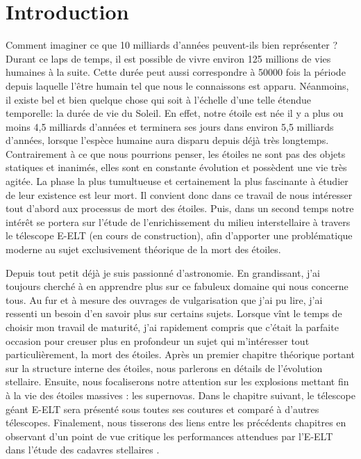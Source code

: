 

\chapter*{Introduction}


\vfill

Comment imaginer ce que 10 milliards d'années peuvent-ils bien représenter ? Durant ce laps de temps, il est possible de vivre environ 125 millions de vies humaines à la suite. Cette durée peut aussi correspondre à 50000 fois la période depuis laquelle l'être humain tel que nous le connaissons est apparu. Néanmoins, il existe bel et bien quelque chose qui soit à l'échelle d'une telle étendue temporelle: la durée de vie du Soleil. En effet, notre étoile est née il y a plus ou moins 4,5 milliards d'années et terminera ses jours dans environ 5,5 milliards d'années, lorsque l'espèce humaine aura disparu depuis déjà très longtemps. Contrairement à ce que nous pourrions penser, les étoiles ne sont pas des objets statiques et inanimés, elles sont en constante évolution et possèdent une vie très agitée. La phase la plus tumultueuse et certainement la plus fascinante à étudier de leur existence est leur mort. Il convient donc dans ce travail de nous intéresser tout d'abord aux processus de mort des étoiles. Puis, dans un second temps notre intérêt se portera sur l'étude de l'enrichissement du milieu interstellaire à travers le télescope E-ELT (en cours de construction), afin d'apporter une problématique moderne au sujet exclusivement théorique de la mort des étoiles.\smallskip

Depuis tout petit déjà je suis passionné d'astronomie. En grandissant, j'ai toujours cherché à en apprendre plus sur ce fabuleux domaine qui nous concerne tous. Au fur et à mesure des ouvrages de vulgarisation que j'ai pu lire, j'ai ressenti un besoin d'en savoir plus sur certains sujets. Lorsque vînt le temps de choisir mon travail de maturité, j'ai rapidement compris que c'était la parfaite occasion pour creuser plus en profondeur un sujet qui m'intéresser tout particulièrement, la mort des étoiles. Après un premier chapitre théorique portant sur la structure interne des étoiles, nous parlerons en détails de l'évolution stellaire. Ensuite, nous focaliserons notre attention sur les explosions mettant fin à la vie des étoiles massives : les supernovas. Dans le chapitre suivant, le télescope géant E-ELT sera présenté sous toutes ses coutures et comparé à d'autres télescopes. Finalement, nous tisserons des liens entre les précédents chapitres en observant d'un point de vue critique les performances attendues par l'E-ELT dans l'étude des cadavres stellaires . 

\vfill
